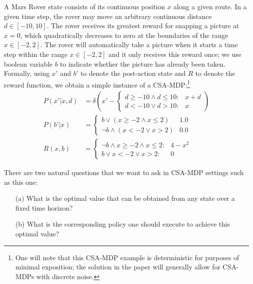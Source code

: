 \begin{example*}[\MarsRover]
\label{ex:knapsack}
A Mars Rover state consists of its continuous position $x$ along a
given route.  In a given time step, the rover may move an arbitrary
continuous distance $d \in [-10,10]$.  The rover receives its greatest
reward for snapping a picture at $x=0$, which quadratically decreases
to zero at the boundaries of the range $x \in [-2,2]$.  The rover will
automatically take a picture when it starts a time step within the
range $x \in [-2,2]$ and it only receives this reward once; we use
boolean variable $b$ to indicate whether the picture has already been
taken.  Formally, using $x'$ and $b'$ to denote the post-action state
and $R$ to denote the reward function, we obtain a simple instance of
a CSA-MDP:\footnote{One will note that this CSA-MDP example is
deterministic for purposes of minimal exposition; the solution in the
paper will generally allow for CSA-MDPs with discrete noise.}
\begin{align*}
P(x'|x,d) & = \delta \left( x' - \begin{cases}
d \geq -10 \land d \leq 10 : & x + d \\
d < -10 \lor d > 10 : & x
\end{cases}
\right)\\
P(b'|x) & = 
\begin{cases}
b \lor (x \geq -2 \land x \leq 2) & 1.0\\
\neg b \land (x < -2 \lor x > 2)  & 0.0
\end{cases}\\
R(x,b) & = \begin{cases}
\neg b \land x \geq -2 \land x \leq 2 : & 4 - x^2 \\
b \lor x < -2 \lor x > 2 : & 0
\end{cases}
\end{align*}
\end{example*}
There are two natural questions that we want to ask in CSA-MDP settings
such as this one:
\begin{enumerate}
\item[(a)] What is the optimal value that can be obtained from any state 
over a fixed time horizon?
\item[(b)] What is the corresponding policy one should execute to
achieve this optimal value?
\end{enumerate}

